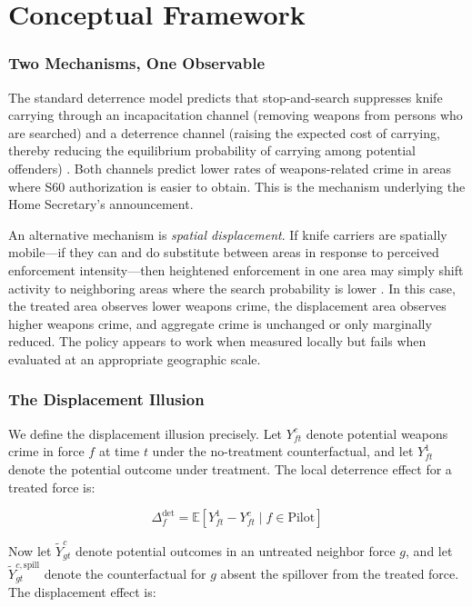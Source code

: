 \documentclass[12pt]{article}
\newcommand{\E}{\mathbb{E}}
\begin{document}
\section{Conceptual Framework}
\label{sec:framework}

\subsubsection*{Two Mechanisms, One Observable}

The standard deterrence model predicts that stop-and-search suppresses knife carrying through an incapacitation channel (removing weapons from persons who are searched) and a deterrence channel (raising the expected cost of carrying, thereby reducing the equilibrium probability of carrying among potential offenders) \citep{nagin2013, braga2019}. Both channels predict lower rates of weapons-related crime in areas where S60 authorization is easier to obtain. This is the mechanism underlying the Home Secretary's announcement.

An alternative mechanism is \textit{spatial displacement}. If knife carriers are spatially mobile---if they can and do substitute between areas in response to perceived enforcement intensity---then heightened enforcement in one area may simply shift activity to neighboring areas where the search probability is lower \citep{weisburd2006, johnson2014}. In this case, the treated area observes lower weapons crime, the displacement area observes higher weapons crime, and aggregate crime is unchanged or only marginally reduced. The policy appears to work when measured locally but fails when evaluated at an appropriate geographic scale.

\subsubsection*{The Displacement Illusion}

We define the displacement illusion precisely. Let $Y^c_{ft}$ denote potential weapons crime in force $f$ at time $t$ under the no-treatment counterfactual, and let $Y^1_{ft}$ denote the potential outcome under treatment. The local deterrence effect for a treated force is:

\begin{equation}
\Delta^{\text{det}}_f = \E[Y^1_{ft} - Y^c_{ft} \mid f \in \text{Pilot}]
\end{equation}

Now let $\tilde{Y}^c_{gt}$ denote potential outcomes in an untreated neighbor force $g$, and let $\tilde{Y}^{c,\text{spill}}_{gt}$ denote the counterfactual for $g$ absent the spillover from the treated force. The displacement effect is:
\end{document}
